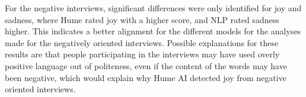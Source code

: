 For the negative interviews, significant differences were only identified for joy and sadness, where Hume rated joy with a higher score, and NLP rated sadness higher. This indicates a better alignment for the different models for the analyses made for the negatively oriented interviews. Possible explanations for these results are that people participating in the interviews may have used overly positive language out of politeness, even if the content of the words may have been negative, which would explain why Hume AI detected joy from negative oriented interviews.
